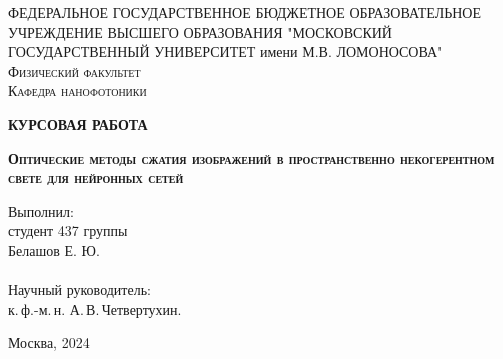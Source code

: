 \begin{titlepage}
	\begin{center}
		\large
		ФЕДЕРАЛЬНОЕ ГОСУДАРСТВЕННОЕ БЮДЖЕТНОЕ ОБРАЗОВАТЕЛЬНОЕ УЧРЕЖДЕНИЕ ВЫСШЕГО ОБРАЗОВАНИЯ "МОСКОВСКИЙ ГОСУДАРСТВЕННЫЙ УНИВЕРСИТЕТ имени М.В. ЛОМОНОСОВА"\\
		\bigskip\large
		\textsc{Физический факультет\\Кафедра нанофотоники}
		\vspace*{1cm}
		\begin{center}
			\LARGE\bfseries\textsc{КУРСОВАЯ РАБОТА}
		\end{center}
		\vspace*{-0.5cm}
		\large\singlespacing\bfseries\textsc{Оптические методы сжатия изображений в пространственно некогерентном свете для нейронных сетей}
	\end{center}
	\normalsize
	\vspace*{1.0cm}
	\begin{flushright}
		Выполнил:\\
		студент 437 группы\\
		Белашов Е. Ю.\\  
		\hspace{1cm}\\
		Научный руководитель:\\
		к.\,ф.-м.\,н. А.\,В.\,Четвертухин.\\
	\end{flushright}
	\vspace*{\fill}
	\begin{center}
		Москва, 2024
	\end{center}
\end{titlepage}
